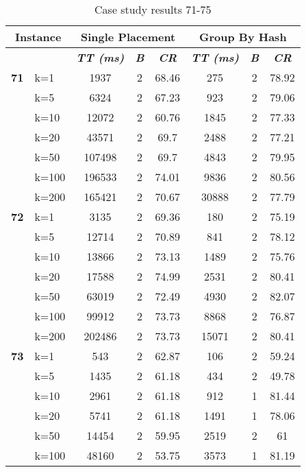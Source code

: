     \begin{table}[htbp]
    \caption{Case study results 71-75}
    \centering
    \begin{tabular}{|l|l|c|c|c|c|c|c|}
    \hline
    \multicolumn{ 2}{|c|}{\textbf{Instance}} & \multicolumn{ 3}{c|}{\textbf{Single Placement}} & \multicolumn{ 3}{c|}{\textbf{Group By Hash}} \\ \hline
    \multicolumn{ 2}{|l|}{} & \textbf{\textit{TT (ms)}} & \textbf{\textit{B}} & \textbf{\textit{CR}} & \textbf{\textit{TT (ms)}} & \textbf{\textit{B}} & \textbf{\textit{CR}} \\ \hline
    \multicolumn{1}{|r|}{\textbf{71}} & k=1 & 1937 & 2 & 68.46 & 275 & 2 & 78.92 \\ 
     & k=5 & 6324 & 2 & 67.23 & 923 & 2 & 79.06 \\ 
     & k=10 & 12072 & 2 & 60.76 & 1845 & 2 & 77.33 \\ 
     & k=20 & 43571 & 2 & 69.7 & 2488 & 2 & 77.21 \\ 
     & k=50 & 107498 & 2 & 69.7 & 4843 & 2 & 79.95 \\ 
     & k=100 & 196533 & 2 & 74.01 & 9836 & 2 & 80.56 \\ 
     & k=200 & 165421 & 2 & 70.67 & 30888 & 2 & 77.79 \\ \hline
    \multicolumn{1}{|r|}{\textbf{72}} & k=1 & 3135 & 2 & 69.36 & 180 & 2 & 75.19 \\ 
     & k=5 & 12714 & 2 & 70.89 & 841 & 2 & 78.12 \\ 
     & k=10 & 13866 & 2 & 73.13 & 1489 & 2 & 75.76 \\ 
     & k=20 & 17588 & 2 & 74.99 & 2531 & 2 & 80.41 \\ 
     & k=50 & 63019 & 2 & 72.49 & 4930 & 2 & 82.07 \\ 
     & k=100 & 99912 & 2 & 73.73 & 8868 & 2 & 76.87 \\ 
     & k=200 & 202486 & 2 & 73.73 & 15071 & 2 & 80.41 \\ \hline
    \multicolumn{1}{|r|}{\textbf{73}} & k=1 & 543 & 2 & 62.87 & 106 & 2 & 59.24 \\ 
     & k=5 & 1435 & 2 & 61.18 & 434 & 2 & 49.78 \\ 
     & k=10 & 2961 & 2 & 61.18 & 912 & 1 & 81.44 \\ 
     & k=20 & 5741 & 2 & 61.18 & 1491 & 1 & 78.06 \\ 
     & k=50 & 14454 & 2 & 59.95 & 2519 & 2 & 61 \\ 
     & k=100 & 48160 & 2 & 53.75 & 3573 & 1 & 81.19 \\ 

\end{tabular}
\end{table}
